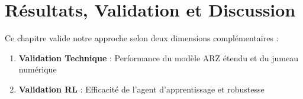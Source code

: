 \chapter{Résultats, Validation et Discussion}
\label{chap:resultats_discussion}

\begin{structurebox}
    Ce chapitre valide notre approche selon deux dimensions complémentaires :
    \begin{enumerate}
        \item \textbf{Validation Technique} : Performance du modèle ARZ étendu et du jumeau numérique
        \item \textbf{Validation RL} : Efficacité de l'agent d'apprentissage et robustesse
    \end{enumerate}
\end{structurebox}




